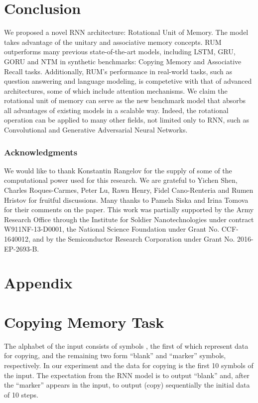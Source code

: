 \documentclass{article} \usepackage{iclr2018_conference,times}
\begin{document}
\section{Conclusion}
We proposed a novel RNN architecture: Rotational Unit of Memory. The model takes advantage of the unitary and associative memory concepts. RUM outperforms many previous state-of-the-art models, including LSTM, GRU, GORU and NTM in synthetic benchmarks: Copying Memory and Associative Recall tasks. Additionally, RUM's performance in real-world tasks, such as question answering and language modeling, is competetive with that of advanced architectures, some of which include attention mechanisms. We claim the rotational unit of memory can serve as the new benchmark model that absorbs all advantages of existing models in a scalable way. Indeed, the rotational operation can be applied to many other fields, not limited only to RNN, such as Convolutional and Generative Adversarial Neural Networks.

\subsubsection*{Acknowledgments} We would like to thank Konstantin Rangelov for the supply of some of the computational power used for this research. We are grateful to Yichen Shen, Charles Roques-Carmes, Peter Lu, Rawn Henry, Fidel Cano-Renteria and Rumen Hristov for fruitful discussions. Many thanks to Pamela Siska and Irina Tomova for their comments on the paper. This work was partially supported by the Army Research Office through the Institute for Soldier Nanotechnologies under contract W911NF-13-D0001, the National Science Foundation under Grant No. CCF-1640012, and by the Semiconductor Research Corporation under Grant No. 2016-EP-2693-B.





\section*{Appendix}
\appendix 
\section{Copying Memory Task} \label{app:sec:copy}
The alphabet of the input consists of symbols , the first  of which represent data for copying, and the remaining two form ``blank'' and ``marker'' symbols, respectively. In our experiment  and the data for copying is the first 10 symbols of the input. The expectation from the RNN model is to output ``blank'' and,  after the ``marker'' appears in the input, to output (copy) sequentially the initial data of 10 steps.
\end{document}
